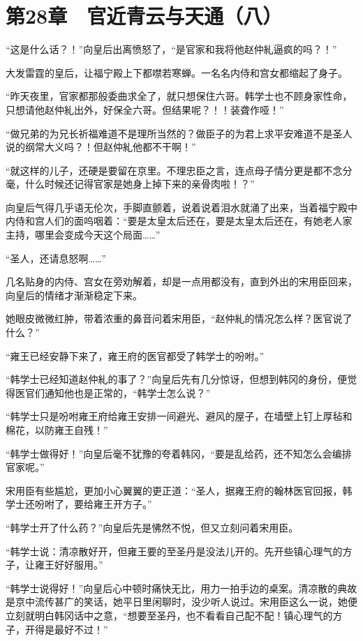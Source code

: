 \section{第28章　官近青云与天通（八）}

“这是什么话？！”向皇后出离愤怒了，“是官家和我将他赵仲糺逼疯的吗？！”

大发雷霆的皇后，让福宁殿上下都噤若寒蝉。一名名内侍和宫女都缩起了身子。

“昨天夜里，官家都那般委曲求全了，就只想保住六哥。韩学士也不顾身家性命，只想请他赵仲糺出外，好保全六哥。但结果呢？！！装聋作哑！”

“做兄弟的为兄长祈福难道不是理所当然的？做臣子的为君上求平安难道不是圣人说的纲常大义吗？！但赵仲糺他都不干啊！”

“就这样的儿子，还硬是要留在京里。不理忠臣之言，连点母子情分更是都不念分毫，什么时候还记得官家是她身上掉下来的亲骨肉啦！？”

向皇后气得几乎语无伦次，手脚直颤着，说着说着泪水就涌了出来，当着福宁殿中内侍和宫人们的面呜咽着：“要是太皇太后还在，要是太皇太后还在，有她老人家主持，哪里会变成今天这个局面……”

“圣人，还请息怒啊……”

几名贴身的内侍、宫女在旁劝解着，却是一点用都没有，直到外出的宋用臣回来，向皇后的情绪才渐渐稳定下来。

她眼皮微微红肿，带着浓重的鼻音问着宋用臣，“赵仲糺的情况怎么样？医官说了什么？”

“雍王已经安静下来了，雍王府的医官都受了韩学士的吩咐。”

“韩学士已经知道赵仲糺的事了？”向皇后先有几分惊讶，但想到韩冈的身份，便觉得医官们通知他也是正常的，“韩学士怎么说？”

“韩学士只是吩咐雍王府给雍王安排一间避光、避风的屋子，在墙壁上钉上厚毡和棉花，以防雍王自残！”

“韩学士做得好！”向皇后毫不犹豫的夸着韩冈，“要是乱给药，还不知怎么会编排官家呢。”

宋用臣有些尴尬，更加小心翼翼的更正道：“圣人，据雍王府的翰林医官回报，韩学士还吩咐了，要给雍王开方子。”

“韩学士开了什么药？”向皇后先是怫然不悦，但又立刻问着宋用臣。

“韩学士说：清凉散好开，但雍王要的至圣丹是没法儿开的。先开些镇心理气的方子，让雍王好好服用。”

“韩学士说得好！”向皇后心中顿时痛快无比，用力一拍手边的桌案。清凉散的典故是京中流传甚广的笑话，她平日里闲聊时，没少听人说过。宋用臣这么一说，她便立刻就明白韩冈话中之意，“想要至圣丹，也不看看自己配不配！镇心理气的方子，开得是最好不过！”

